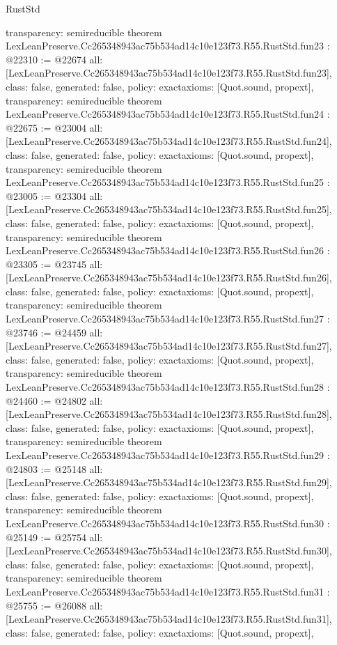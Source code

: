 \begin{lexlean}{RustStd}
\begin{coremodule}
{  transparency: semireducible
}
theorem LexLeanPreserve.Cc265348943ac75b534ad14c10e123f73.R55.RustStd.fun23 : @22310 := @22674 {
  all: [LexLeanPreserve.Cc265348943ac75b534ad14c10e123f73.R55.RustStd.fun23],
  class: false,
  generated: false,
  policy: exact{axioms: [Quot.sound, propext]},
  transparency: semireducible
}
theorem LexLeanPreserve.Cc265348943ac75b534ad14c10e123f73.R55.RustStd.fun24 : @22675 := @23004 {
  all: [LexLeanPreserve.Cc265348943ac75b534ad14c10e123f73.R55.RustStd.fun24],
  class: false,
  generated: false,
  policy: exact{axioms: [Quot.sound, propext]},
  transparency: semireducible
}
theorem LexLeanPreserve.Cc265348943ac75b534ad14c10e123f73.R55.RustStd.fun25 : @23005 := @23304 {
  all: [LexLeanPreserve.Cc265348943ac75b534ad14c10e123f73.R55.RustStd.fun25],
  class: false,
  generated: false,
  policy: exact{axioms: [Quot.sound, propext]},
  transparency: semireducible
}
theorem LexLeanPreserve.Cc265348943ac75b534ad14c10e123f73.R55.RustStd.fun26 : @23305 := @23745 {
  all: [LexLeanPreserve.Cc265348943ac75b534ad14c10e123f73.R55.RustStd.fun26],
  class: false,
  generated: false,
  policy: exact{axioms: [Quot.sound, propext]},
  transparency: semireducible
}
theorem LexLeanPreserve.Cc265348943ac75b534ad14c10e123f73.R55.RustStd.fun27 : @23746 := @24459 {
  all: [LexLeanPreserve.Cc265348943ac75b534ad14c10e123f73.R55.RustStd.fun27],
  class: false,
  generated: false,
  policy: exact{axioms: [Quot.sound, propext]},
  transparency: semireducible
}
theorem LexLeanPreserve.Cc265348943ac75b534ad14c10e123f73.R55.RustStd.fun28 : @24460 := @24802 {
  all: [LexLeanPreserve.Cc265348943ac75b534ad14c10e123f73.R55.RustStd.fun28],
  class: false,
  generated: false,
  policy: exact{axioms: [Quot.sound, propext]},
  transparency: semireducible
}
theorem LexLeanPreserve.Cc265348943ac75b534ad14c10e123f73.R55.RustStd.fun29 : @24803 := @25148 {
  all: [LexLeanPreserve.Cc265348943ac75b534ad14c10e123f73.R55.RustStd.fun29],
  class: false,
  generated: false,
  policy: exact{axioms: [Quot.sound, propext]},
  transparency: semireducible
}
theorem LexLeanPreserve.Cc265348943ac75b534ad14c10e123f73.R55.RustStd.fun30 : @25149 := @25754 {
  all: [LexLeanPreserve.Cc265348943ac75b534ad14c10e123f73.R55.RustStd.fun30],
  class: false,
  generated: false,
  policy: exact{axioms: [Quot.sound, propext]},
  transparency: semireducible
}
theorem LexLeanPreserve.Cc265348943ac75b534ad14c10e123f73.R55.RustStd.fun31 : @25755 := @26088 {
  all: [LexLeanPreserve.Cc265348943ac75b534ad14c10e123f73.R55.RustStd.fun31],
  class: false,
  generated: false,
  policy: exact{axioms: [Quot.sound, propext]},
}
\end{coremodule}
\end{lexlean}
